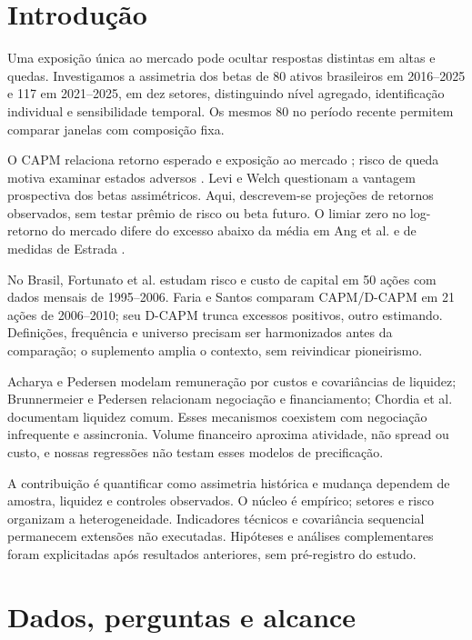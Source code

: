 \section{Introdução}
Uma exposição única ao mercado pode ocultar respostas distintas em altas
e quedas. Investigamos a assimetria dos betas de 80 ativos brasileiros em
2016--2025 e 117 em 2021--2025, em dez setores, distinguindo nível agregado,
identificação individual e sensibilidade temporal. Os mesmos 80 no período
recente permitem comparar janelas com composição fixa.

O CAPM relaciona retorno esperado e exposição ao mercado \cite{sharpe1964};
risco de queda motiva examinar estados adversos \cite{ang2006}. Levi e Welch
\cite{leviwelch2020} questionam a vantagem prospectiva dos betas assimétricos.
Aqui, descrevem-se projeções de retornos observados, sem testar prêmio de
risco ou beta futuro. O limiar zero no log-retorno do mercado difere do
excesso abaixo da média em Ang et al. \cite{ang2004working} e de medidas
de Estrada \cite{estrada2002,estrada2007}.

No Brasil, Fortunato et al. \cite{fortunato2010} estudam risco e custo de
capital em 50 ações com dados mensais de 1995--2006. Faria e Santos
\cite{faria2010} comparam CAPM/D-CAPM em 21 ações de 2006--2010;
seu D-CAPM trunca excessos positivos, outro estimando. Definições,
frequência e universo precisam ser harmonizados antes da comparação;
o suplemento amplia o contexto, sem reivindicar pioneirismo.

Acharya e Pedersen \cite{acharyapedersen2005} modelam remuneração por
custos e covariâncias de liquidez; Brunnermeier e Pedersen
\cite{brunnermeierpedersen2009} relacionam negociação e financiamento;
Chordia et al. \cite{chordia2000} documentam liquidez comum. Esses mecanismos
coexistem com negociação infrequente e assincronia. Volume financeiro
aproxima atividade, não spread ou custo, e nossas regressões não testam
esses modelos de precificação.

A contribuição é quantificar como assimetria histórica e mudança dependem
de amostra, liquidez e controles observados. O núcleo é empírico; setores
e risco organizam a heterogeneidade. Indicadores técnicos e covariância
sequencial permanecem extensões não executadas. Hipóteses e análises
complementares foram explicitadas após resultados anteriores, sem
pré-registro do estudo.

\section{Dados, perguntas e alcance}
